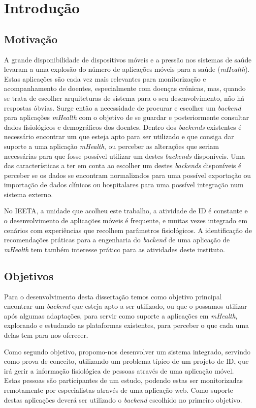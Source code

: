 \chapter{Introdu\c c\~ao}

\section{Motivação}

A grande disponibilidade de dispositivos móveis e a pressão nos sistemas de saúde levaram a uma explosão do número de aplicações móveis para a saúde (\textit{mHealth}). Estas aplicações são cada vez mais relevantes para monitorização e acompanhamento de doentes, especialmente com doenças crónicas\cite{mHealth-chronic-disease}, mas, quando se trata de escolher arquiteturas de sistema para o seu desenvolvimento, não há respostas óbvias. Surge então a necessidade de procurar e escolher um \textit{backend} para aplicações \textit{mHealth} com o objetivo de se guardar e posteriormente consultar dados fisiológicos e demográficos dos doentes.
Dentro dos \textit{backends} existentes é necessário encontrar um que esteja apto para ser utilizado e que consiga dar suporte a uma aplicação \textit{mHealth}, ou perceber as alterações que seriam necessárias para que fosse possível utilizar um destes \textit{backends} disponíveis. Uma das características a ter em conta ao escolher um destes \textit{backends} disponíveis é perceber se os dados se encontram normalizados para uma possível exportação ou importação de dados clínicos ou hospitalares para uma possível integração num sistema externo. \par
No \gls{IEETA}, a unidade que acolheu este trabalho, a atividade de \gls{ID} é constante e o desenvolvimento de aplicações móveis é frequente, e muitas vezes integrado em cenários com experiências que recolhem parâmetros fisiológicos. A identificação de recomendações práticas para a engenharia do \textit{backend} de uma aplicação de \textit{mHealth} tem também interesse prático para as atividades deste instituto.

\section{Objetivos}
Para o desenvolvimento desta dissertação temos como objetivo principal encontrar um \textit{backend} que esteja apto a ser utilizado, ou que o possamos utilizar após algumas adaptações, para servir como suporte a aplicações em \textit{mHealth}, explorando e estudando as plataformas existentes, para perceber o que cada uma delas tem para nos oferecer. \par
Como segundo objetivo, propomo-nos desenvolver um sistema integrado, servindo como prova de conceito, utilizando um problema típico de um projeto de \gls{ID}, que irá gerir a informação fisiológica de pessoas através de uma aplicação móvel. Estas pessoas são participantes de um estudo, podendo estas ser monitorizadas remotamente por especialistas através de uma aplicação web. Como suporte destas aplicações deverá ser utilizado o \textit{backend} escolhido no primeiro objetivo.

